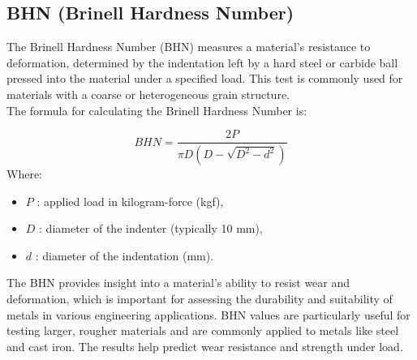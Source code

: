 \documentclass{article}
\begin{document}
\subsection{BHN (Brinell Hardness Number)}
The Brinell Hardness Number (BHN) measures a material's resistance to deformation, determined by the indentation left by a hard steel or carbide ball pressed into the material under a specified load. This test is commonly used for materials with a coarse or heterogeneous grain structure.\\[1em]
The formula for calculating the Brinell Hardness Number is:

\begin{equation}
    BHN = \frac{2P}{\pi D (D - \sqrt{D^2 - d^2})}
\end{equation}
Where:
\begin{itemize}[itemsep=-1mm]
    \item \( P \) : applied load in kilogram-force (kgf),
    \item \( D \) : diameter of the indenter (typically 10 mm),
    \item \( d \) : diameter of the indentation (mm).
\end{itemize}
The BHN provides insight into a material's ability to resist wear and deformation, which is important for assessing the durability and suitability of metals in various engineering applications. BHN values are particularly useful for testing larger, rougher materials and are commonly applied to metals like steel and cast iron. The results help predict wear resistance and strength under load.
\end{document}
